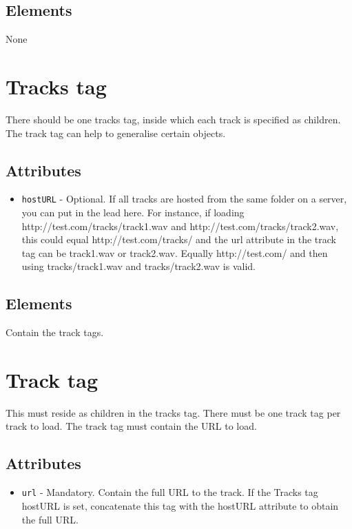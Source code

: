 \documentclass{article}
\begin{document}
\subsection{Elements}
None

\section{Tracks tag}

There should be one tracks tag, inside which each track is specified as children. The track tag can help to generalise certain objects.

\subsection{Attributes}
\begin{itemize}
\item \texttt{hostURL} - Optional. If all tracks are hosted from the same folder on a server, you can put in the lead here. For instance, if loading http://test.com/tracks/track1.wav and http://test.com/tracks/track2.wav, this could equal http://test.com/tracks/ and the url attribute in the track tag can be track1.wav or track2.wav. Equally http://test.com/ and then using tracks/track1.wav and tracks/track2.wav is valid.
\end{itemize}

\subsection{Elements}
Contain the track tags.

\section{Track tag}

This must reside as children in the tracks tag. There must be one track tag per track to load. The track tag must contain the URL to load.

\subsection{Attributes}
\begin{itemize}
\item \texttt{url} - Mandatory. Contain the full URL to the track. If the Tracks tag hostURL is set, concatenate this tag with the hostURL attribute to obtain the full URL.
\end{itemize}
\end{document}
